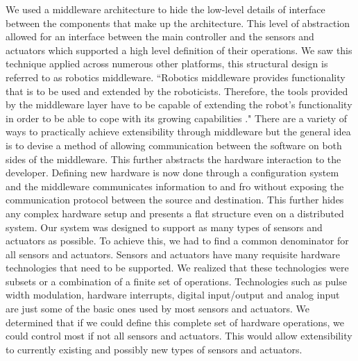 We used a middleware architecture to hide the low-level details of interface between the components that make up the \xten architecture. This level of abstraction allowed for an interface between the main controller and the sensors and actuators which supported a high level definition of their operations. We saw this technique applied across numerous other platforms, this structural design is referred to as robotics middleware. ``Robotics middleware provides functionality that is to be used and extended by the roboticists. Therefore, the tools provided by the middleware layer have to be capable of extending the robot's functionality in order to be able to cope with its growing capabilities \parencite{advanced}." There are a variety of ways to practically achieve extensibility through middleware but the general idea is to devise a method of allowing communication between the software on both sides of the middleware. This further abstracts the hardware interaction to the developer. Defining new hardware is now done through a configuration system and the middleware communicates information to and fro without exposing the communication protocol between the source and destination. This further hides any complex hardware setup and presents a flat structure even on a distributed system.
Our system was designed to support as many types of sensors and actuators as possible. To achieve this, we had to find a common denominator for all sensors and actuators. Sensors and actuators have many requisite hardware technologies that need to be supported. We realized that these technologies were subsets or a combination of a finite set of operations. Technologies such as pulse width modulation, hardware interrupts, digital input/output and analog input are just some of the basic ones used by most sensors and actuators. We determined that if we could define this complete set of hardware operations, we could control most if not all sensors and actuators. This would allow extensibility to currently existing and possibly new types of sensors and actuators.




